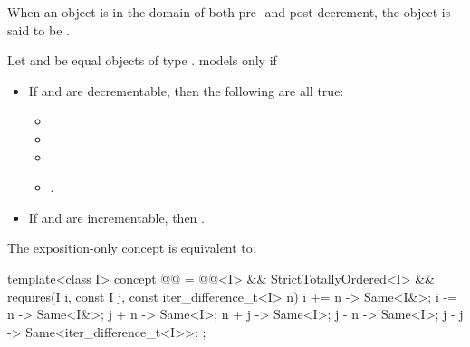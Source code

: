 \begin{itemdescr}
\pnum
When an object is in the domain of both pre- and post-decrement,
the object is said to be .

\pnum
Let  and  be equal objects of type .
 models  only if
\begin{itemize}
\item If  and  are decrementable,
  then the following are all true:
  \begin{itemize}
  \item {}
  \item {}
  \item {}
  \item {}.
  \end{itemize}
\item If  and  are incrementable,
  then .
\end{itemize}
\end{itemdescr}

\pnum
The exposition-only  concept is equivalent to:
\begin{itemdecl}
template<class I>
  concept @@ =
    @@<I> && StrictTotallyOrdered<I> &&
    requires(I i, const I j, const iter_difference_t<I> n) {
      { i += n } -> Same<I&>;
      { i -= n } -> Same<I&>;
      { j +  n } -> Same<I>;
      { n +  j } -> Same<I>;
      { j -  n } -> Same<I>;
      { j -  j } -> Same<iter_difference_t<I>>;
    };
\end{itemdecl}

